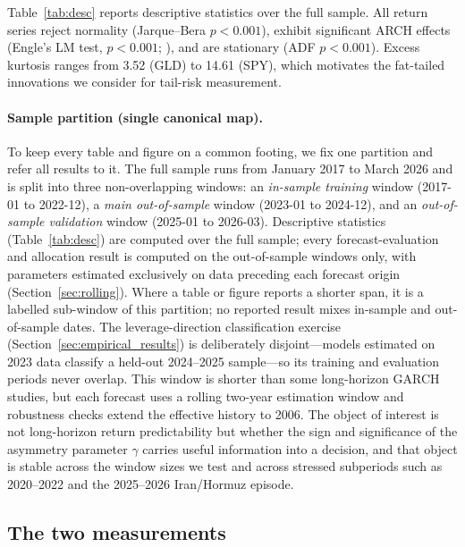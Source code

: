 Table~\ref{tab:desc} reports descriptive statistics over the full sample. All return series reject normality (Jarque--Bera $p<0.001$), exhibit significant ARCH effects (Engle's LM test, $p<0.001$; \citealt{engle1982}), and are stationary (ADF $p<0.001$). Excess kurtosis ranges from 3.52 (GLD) to 14.61 (SPY), which motivates the fat-tailed innovations we consider for tail-risk measurement.

\paragraph{Sample partition (single canonical map).}
To keep every table and figure on a common footing, we fix one partition and refer all results to it. The full sample runs from January 2017 to March 2026 and is split into three non-overlapping windows: an \emph{in-sample training} window (2017-01 to 2022-12), a \emph{main out-of-sample} window (2023-01 to 2024-12), and an \emph{out-of-sample validation} window (2025-01 to 2026-03). Descriptive statistics (Table~\ref{tab:desc}) are computed over the full sample; every forecast-evaluation and allocation result is computed on the out-of-sample windows only, with parameters estimated exclusively on data preceding each forecast origin (Section~\ref{sec:rolling}). Where a table or figure reports a shorter span, it is a labelled sub-window of this partition; no reported result mixes in-sample and out-of-sample dates. The leverage-direction classification exercise (Section~\ref{sec:empirical_results}) is deliberately disjoint---models estimated on 2023 data classify a held-out 2024--2025 sample---so its training and evaluation periods never overlap. This window is shorter than some long-horizon GARCH studies, but each forecast uses a rolling two-year estimation window and robustness checks extend the effective history to 2006. The object of interest is not long-horizon return predictability but whether the sign and significance of the asymmetry parameter $\gamma$ carries useful information into a decision, and that object is stable across the window sizes we test and across stressed subperiods such as 2020--2022 and the 2025--2026 Iran/Hormuz episode.

\subsection{The two measurements}

